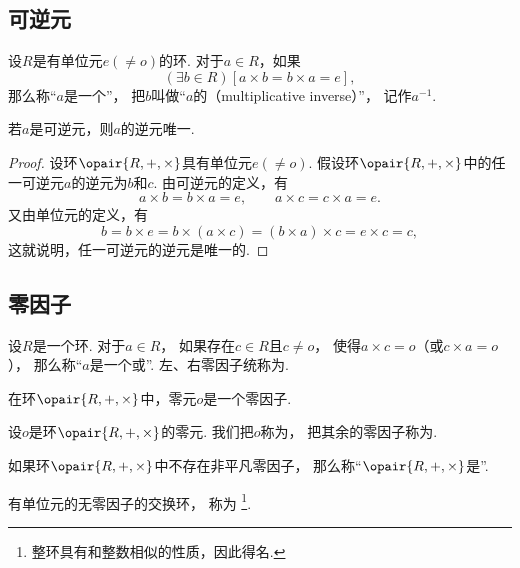 \subsection{可逆元}
\begin{definition}
设\(R\)是有单位元\(e(\neq o)\)的环.
对于\(a \in R\)，如果\[
	(\exists b \in R)[a \times b = b \times a = e],
\]
那么称“\(a\)是一个”，
把\(b\)叫做“\(a\)的（multiplicative inverse）”，
记作\(a^{-1}\).
\end{definition}

\begin{proposition}
若\(a\)是可逆元，则\(a\)的逆元唯一.
\begin{proof}
设环\(\opair{R,+,\times}\)具有单位元\(e(\neq o)\).
假设环\(\opair{R,+,\times}\)中的任一可逆元\(a\)的逆元为\(b\)和\(c\).
由可逆元的定义，有\[
	a \times b = b \times a = e,
	\qquad
	a \times c = c \times a = e.
\]
又由单位元的定义，有\[
	b = b \times e
	= b \times (a \times c)
	= (b \times a) \times c
	= e \times c
	= c,
\]
这就说明，任一可逆元的逆元是唯一的.
\end{proof}
\end{proposition}

\subsection{零因子}
\begin{definition}
设\(R\)是一个环.
对于\(a \in R\)，
如果存在\(c \in R\)且\(c \neq o\)，
使得\(a \times c = o\)（或\(c \times a = o\)），
那么称“\(a\)是一个或”.
左、右零因子统称为.
\end{definition}

\begin{proposition}
在环\(\opair{R,+,\times}\)中，零元\(o\)是一个零因子.
\end{proposition}

\begin{definition}
设\(o\)是环\(\opair{R,+,\times}\)的零元.
我们把\(o\)称为，
把其余的零因子称为.
\end{definition}

\begin{definition}
如果环\(\opair{R,+,\times}\)中不存在非平凡零因子，
那么称“\(\opair{R,+,\times}\)是”.
\end{definition}

\begin{definition}
有单位元的无零因子的交换环，
称为%
\footnote{整环具有和整数相似的性质，因此得名.}.
\end{definition}

